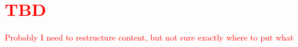 \chapter{\textcolor{red}{TBD}}
\label{chap:2}
%
\textcolor{red}{Probably I need to restructure content, but not sure exactly where to put what}
